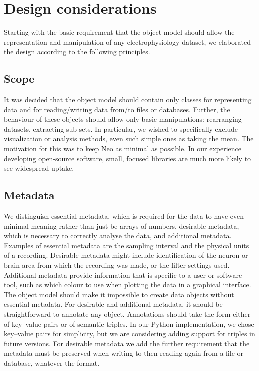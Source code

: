 \documentclass{frontiers}
\begin{document}
\section{Design considerations}


Starting with the basic requirement that the object model should allow the representation and manipulation of any electrophysiology dataset, we elaborated the design according to the following principles. 

\subsection{Scope}

It was decided that the object model should contain only classes for representing data and for reading/writing data from/to files or databases. Further, the behaviour of these objects should allow only basic manipulations: rearranging datasets, extracting sub-sets. In particular, we wished to specifically exclude visualization or analysis methods, even such simple ones as taking the mean. The motivation for this was to keep Neo as minimal as possible. In our experience developing open-source software, small, focused libraries are much more likely to see widespread uptake.

\subsection{Metadata}

We distinguish essential metadata, which is required for the data to have even minimal meaning rather than just be arrays of numbers, desirable metadata, which is necessary to correctly analyse the data, and additional metadata.
Examples of essential metadata are the sampling interval and the physical units of a recording.
Desirable metadata might include identification of the neuron or brain area from which the recording was made, or the filter settings used.
Additional metadata provide information that is specific to a user or software tool, such as which colour to use when plotting the data in a graphical interface.
The object model should make it impossible to create data objects without essential metadata.
For desirable and additional metadata, it should be straightforward to annotate any object. 
Annotations should take the form either of key--value pairs or of semantic triples. 
In our Python implementation, we chose key--value pairs for simplicity, but we are considering adding support for triples in future versions.
For desirable metadata we add the further requirement that the metadata must be preserved when writing to then reading again from a file or database, whatever the format.
\end{document}
